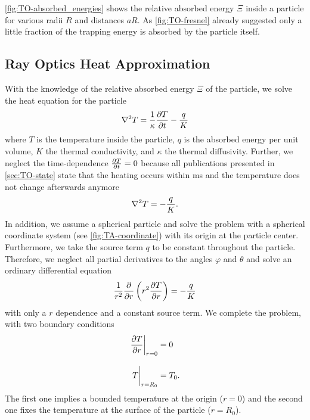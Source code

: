 \cref{fig:TO-absorbed_energies} shows the relative absorbed energy $\Xi$ inside 
a particle for various radii $R$ and distances $aR$. As \cref{fig:TO-fresnel} 
already suggested only a little fraction of the trapping energy is absorbed by 
the particle itself.

\subsection{Ray Optics Heat Approximation}

With the knowledge of the relative absorbed energy $\Xi$ of the particle, we 
solve the heat equation for the particle
\begin{equation}
  \laplacian{T} = \frac{1}{\kappa} \pdv{T}{t} - \frac{q}{K}
  \label{eq:TO-heat-prob}
\end{equation}
where $T$ is the temperature inside the particle, $q$ is the absorbed energy 
per unit volume, $K$ the thermal conductivity, and $\kappa$ the thermal 
diffusivity. Further, we neglect the time-dependence $\pdv{T}{t}= 0$ because 
all publications presented in \cref{sec:TO-state} state that the heating occurs 
within \si{\ms} and the temperature does not change afterwards anymore 
\begin{equation}
  \laplacian{T} = - \frac{q}{K}.
  \label{eq:TO-heat-stat}
\end{equation}
 In addition, we assume a spherical particle and solve the problem with a 
 spherical coordinate system (see \cref{fig:TA-coordinate}) with its origin at 
 the particle center. Furthermore, we take the source term $q$ to be constant 
 throughout the particle. Therefore, we neglect all partial derivatives to the 
 angles $\varphi$ and $\theta$ and solve an ordinary differential equation
\begin{equation}
    \frac{1}{r^{2}}\pdv{r}\left( r^{2}\pdv{T}{r} \right) = - \frac{q}{K}
  \label{eq:TO-heat-spherical}
\end{equation}
with only a $r$ dependence and a constant source term. We complete the problem, 
with two boundary conditions
\begin{subequations}
\begin{align}
  \eval{\pdv{T}{r}}_{r=0} &= 0\\[3mm]
  \eval{T}_{r=R_{0}} &= T_{0}.
\end{align}
\end{subequations}
The first one implies a bounded temperature at the origin ($r=0$) and the 
second one fixes the temperature at the surface of the particle ($r=R_{0}$). 
